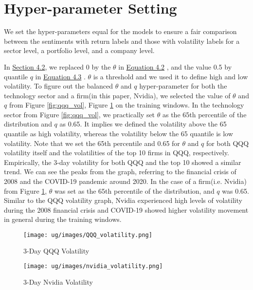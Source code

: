 \documentclass[logo,bsc,singlespacing,parskip]{infthesis}
\begin{document}
\section{Hyper-parameter Setting}
\label{sec:hyperparameter}
We set the hyper-parameters equal for the models to ensure a fair comparison between the sentiments with return labels and those with volatility labels for 
a sector level, a portfolio level, and a company level.

In \hyperref[sec:volatility_label]{Section 4.2}, we replaced 0 by the $\theta$ in \hyperref[4.2]{Equation 4.2} , and the value 0.5 by quantile $q$ in \hyperref[4.3]{Equation 4.3} . $\theta$ is a threshold and we used it to define high and low volatility. To figure out the balanced $\theta $ and $q$ hyper-parameter for both the technology sector and a firm(in this paper, Nvidia), we selected the value of $\theta$ and $q$ from Figure \ref{fig:qqq_vol}, Figure \ref{fig:nvidia_vol} on the training windows. In the technology sector from Figure \ref{fig:qqq_vol}, we practically set $\theta$ as the 65th percentile of the distribution and $q$ as 0.65. It implies we defined the volatility above the 65 quantile as high volatility, whereas the volatility below the 65 quantile is low volatility. Note that we set the 65th percentile and 0.65 for $\theta$ and $q$ for both QQQ volatility itself and the volatilities of the top 10 firms in QQQ, respectively. Empirically, the 3-day volatility for both QQQ and the top 10 showed a similar trend. We can see the peaks from the graph, referring to the financial crisis of 2008 and the COVID-19 pandemic around 2020. In the case of a firm(i.e. Nvidia) from Figure \ref{fig:nvidia_vol}, $\theta $ was set as the 65th percentile of the distribution, and $q$ was 0.65. Similar to the QQQ volatility graph, Nvidia experienced high levels of volatility during the 2008 financial crisis and COVID-19 showed higher volatility movement in general during the training windows.

\begin{figure}[ht]
  \centering
  \begin{minipage}{0.5\textwidth}
    \centering
    \texttt{[image: ug/images/QQQ\_volatility.png]} %
    \caption{3-Day QQQ Volatility}
    \label{fig:qqq_vol}
  \end{minipage}%
  \begin{minipage}{0.5\textwidth}
    \centering
    \texttt{[image: ug/images/nvidia\_volatility.png]} %
    \caption{3-Day Nvidia Volatility}
    \label{fig:nvidia_vol}
  \end{minipage}
\end{figure}
\end{document}
